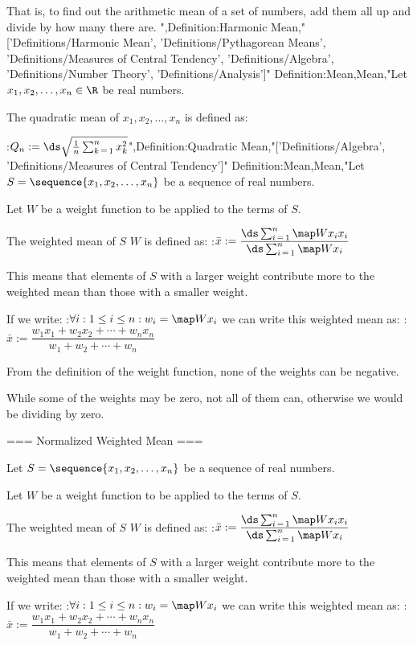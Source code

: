 That is, to find out the arithmetic mean of a set of numbers, add them all up and divide by how many there are.
",Definition:Harmonic Mean,"['Definitions/Harmonic Mean', 'Definitions/Pythagorean Means', 'Definitions/Measures of Central Tendency', 'Definitions/Algebra', 'Definitions/Number Theory', 'Definitions/Analysis']"
Definition:Mean,Mean,"Let $x_1, x_2, \ldots, x_n \in \R$ be real numbers.

The quadratic mean of $x_1, x_2, \ldots, x_n$ is defined as:

:$Q_n := \ds \sqrt {\frac 1 n \sum_{k \mathop = 1}^n x_k^2}$",Definition:Quadratic Mean,"['Definitions/Algebra', 'Definitions/Measures of Central Tendency']"
Definition:Mean,Mean,"Let $S = \sequence {x_1, x_2, \ldots, x_n}$ be a sequence of real numbers.

Let $W$ be a weight function to be applied to the terms of $S$.


The weighted mean of $S$  $W$ is defined as:
:$\bar x := \dfrac {\ds \sum_{i \mathop = 1}^n \map W {x_i} x_i} {\ds \sum_{i \mathop = 1}^n \map W {x_i} }$

This means that elements of $S$ with a larger weight contribute more to the weighted mean than those with a smaller weight.


If we write:
:$\forall i: 1 \le i \le n: w_i = \map W {x_i}$
we can write this weighted mean as:
:$\bar x := \dfrac {w_1 x_1 + w_2 x_2 + \cdots + w_n x_n} {w_1 + w_2 + \cdots + w_n}$


From the definition of the weight function, none of the weights can be negative.

While some of the weights may be zero, not all of them can, otherwise we would be dividing by zero.


=== Normalized Weighted Mean ===

Let $S = \sequence {x_1, x_2, \ldots, x_n}$ be a sequence of real numbers.

Let $W$ be a weight function to be applied to the terms of $S$.


The weighted mean of $S$  $W$ is defined as:
:$\bar x := \dfrac {\ds \sum_{i \mathop = 1}^n \map W {x_i} x_i} {\ds \sum_{i \mathop = 1}^n \map W {x_i} }$

This means that elements of $S$ with a larger weight contribute more to the weighted mean than those with a smaller weight.


If we write:
:$\forall i: 1 \le i \le n: w_i = \map W {x_i}$
we can write this weighted mean as:
:$\bar x := \dfrac {w_1 x_1 + w_2 x_2 + \cdots + w_n x_n} {w_1 + w_2 + \cdots + w_n}$


